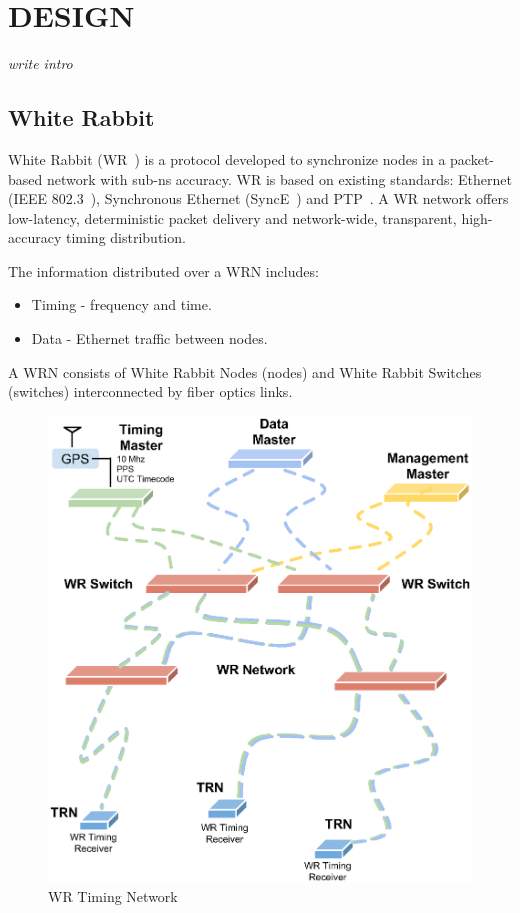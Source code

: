 \section{DESIGN}

\textit{write intro}

\subsection{White Rabbit}

White Rabbit (WR~\cite{wr}) is a protocol developed to
synchronize nodes in a packet-based network with sub-ns accuracy. WR is based 
on existing standards: Ethernet (IEEE 802.3~\cite{internet}),
Synchronous Ethernet (SyncE~\cite{sync}) and PTP~\cite{ptp}. 
A WR network offers low-latency, deterministic packet delivery and network-wide, 
transparent, high-accuracy timing distribution. 

The information distributed over a WRN includes:
\begin{itemize}
    \item Timing - frequency and time.
    \item Data - Ethernet traffic between nodes.
\end{itemize}

A WRN consists of White Rabbit Nodes (nodes) and White
Rabbit Switches (switches) interconnected by fiber optics links. 

\begin{figure}[htb]
   \centering
   \includegraphics*[scale=0.5]{fig/icaleps_networ.eps}
   \caption{WR Timing Network}
   \label{network}
\end{figure}


